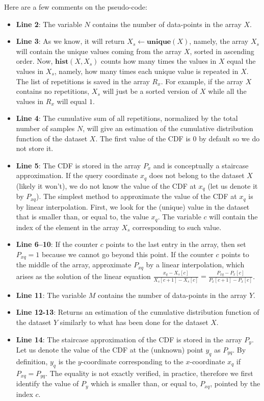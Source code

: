\documentclass[10pt,final]{siamltex}
\begin{document}
Here are a few comments on the pseudo-code:
%
\begin{itemize}
  \item \textbf{Line 2}: The variable $N$ contains the number of data-points in the array $X$.
  \item \textbf{Line 3}: As we know, it will return $X_s \gets \mathbf{unique}(X)$, namely, the array $X_s$ will contain the unique values coming from the array $X$, sorted in ascending order. Now, $\mathbf{hist}(X,X_s)$ counts how many times the values in $X$ equal the values in $X_s$, namely, how many times each unique value is repeated in $X$. The list of repetitions is saved in the array $R_x$. For example, if the array $X$ contains no repetitions, $X_s$ will just be a sorted version of $X$ while all the values in $R_x$ will equal $1$.
  \item \textbf{Line 4}: The cumulative sum of all repetitions, normalized by the total number of samples $N$, will give an estimation of the cumulative distribution function of the dataset $X$. The first value of the CDF is $0$ by default so we do not store it.
  \item \textbf{Line 5}: The CDF is stored in the array $P_x$ and is conceptually a staircase approximation. If the query coordinate $x_q$ does not belong to the dataset $X$ (likely it won't), we do not know the value of the CDF at $x_q$ (let us denote it by $P_{xq}$). The simplest method to approximate the value of the CDF at $x_q$ is by linear interpolation. First, we look for the (unique) value in the dataset that is smaller than, or equal to, the value $x_q$. The variable $c$ will contain the index of the element in the array $X_s$ corresponding to such value.
  \item \textbf{Line 6--10}: If the counter $c$ points to the last entry in the array, then set $P_{xq}=1$ because we cannot go beyond this point. If the counter $c$ points to the middle of the array, approximate $P_{xq}$ by a linear interpolation, which arises as the solution of the linear equation $\tfrac{x_q-X_s[c]}{X_s[c+1]-X_s[c]}=\tfrac{P_{xq}-P_x[c]}{P_x[c+1]-P_x[c]}$.
  \item \textbf{Line 11}: The variable $M$ contains the number of data-points in the array $Y$.
  \item \textbf{Line 12-13}: Returns an estimation of the cumulative distribution function of the dataset $Y$ similarly to what has been done for the dataset $X$.
  \item \textbf{Line 14}: The staircase approximation of the CDF is stored in the array $P_y$. Let us denote the value of the CDF at the (unknown) point $y_q$ as $P_{yq}$. By definition, $y_q$ is the $y$-coordinate corresponding to the $x$-coordinate $x_q$ if $P_{xq} = P_{yq}$. The equality is not exactly verified, in practice, therefore we first identify the value of $P_y$ which is smaller than, or equal to, $P_{xq}$, pointed by the index $c$.

\end{itemize}
\end{document}
